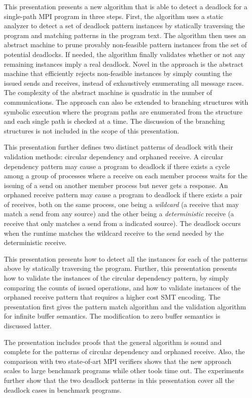 This presentation presents a new algorithm that is able to detect a deadlock for a single-path MPI program in three steps. First, the algorithm uses a static analyzer to detect a set of deadlock pattern instances by statically traversing the program and matching patterns in the program text. The algorithm then uses an abstract machine to prune provably non-feasible pattern instances from the set of potential deadlocks. If needed, the algorithm finally validates whether or not any remaining instances imply a real deadlock. Novel in the approach is the abstract machine that efficiently rejects non-feasible instances by simply counting the issued sends and receives, instead of exhaustively enumerating all message races. The complexity of the abstract machine is quadratic in the number of communications. The approach can also be extended to branching structures with symbolic execution where the program paths are enumerated from the structure and each single path is checked at a time. The discussion of the branching structures is not included in the scope of this presentation.

This presentation further defines two distinct patterns of deadlock with their validation methods: circular dependency and orphaned receive. A circular dependency pattern may cause a program to deadlock if there exists a cycle among a group of processes where a receive on each member process waits for the issuing of a send on another member process but never gets a response. An orphaned receive pattern may cause a program to deadlock if there exists a pair of receives, both on the same process, one being a \emph{wildcard} (a receive that may match a send from any source) and the other being a \emph{deterministic} receive (a receive that only matches a send from a indicated source). The deadlock occurs when the runtime matches the wildcard receive to the send needed by the deterministic receive. 

This presentation presents how to detect all the instances for each of the patterns above by statically traversing the program. Further, this presentation presents how to validate the instances of the circular dependency pattern, by simply comparing the counts of issued operations, and how to validate instances of the orphaned receive pattern that requires a higher cost SMT encoding. The presentation first gives the pattern match algorithm and the validation algorithm for infinite buffer semantics. The modification to zero buffer semantics is discussed latter.  

The presentation includes proofs that the general algorithm is sound and complete for the patterns of circular dependency and orphaned receive. Also, the comparison with two state-of-art MPI verifiers shows that the new approach scales to large benchmark programs while other tools time out. The experiments further show that the two deadlock patterns in this presentation cover all the deadlock cases in benchmark programs.

